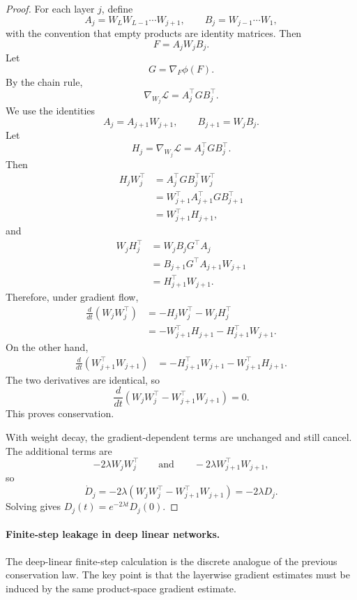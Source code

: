 \documentclass{article}
\newcommand{\Loss}{\mathcal{L}}
\begin{document}
\begin{proof}
For each layer \(j\), define
\[
    A_j=W_LW_{L-1}\cdots W_{j+1},
    \qquad
    B_j=W_{j-1}\cdots W_1,
\]
with the convention that empty products are identity matrices.  Then
\[
    F=A_jW_jB_j.
\]
Let
\[
    G=\nabla_F\phi(F).
\]
By the chain rule,
\[
    \nabla_{W_j}\Loss
    =
    A_j^\top G B_j^\top.
\]
We use the identities
\[
    A_j=A_{j+1}W_{j+1},
    \qquad
    B_{j+1}=W_jB_j.
\]
Let
\[
    H_j=\nabla_{W_j}\Loss=A_j^\top G B_j^\top.
\]
Then
\[
\begin{aligned}
    H_jW_j^\top
    &=
    A_j^\top G B_j^\top W_j^\top  \\
    &=
    W_{j+1}^\top A_{j+1}^\top G B_{j+1}^\top  \\
    &=
    W_{j+1}^\top H_{j+1},
\end{aligned}
\]
and
\[
\begin{aligned}
    W_jH_j^\top
    &=
    W_jB_jG^\top A_j  \\
    &=
    B_{j+1}G^\top A_{j+1}W_{j+1}  \\
    &=
    H_{j+1}^\top W_{j+1}.
\end{aligned}
\]
Therefore, under gradient flow,
\[
\begin{aligned}
    \frac{d}{dt}(W_jW_j^\top)
    &=
    -H_jW_j^\top-W_jH_j^\top  \\
    &=
    -W_{j+1}^\top H_{j+1}
    -
    H_{j+1}^\top W_{j+1}.
\end{aligned}
\]
On the other hand,
\[
\begin{aligned}
    \frac{d}{dt}(W_{j+1}^\top W_{j+1})
    &=
    -H_{j+1}^\top W_{j+1}
    -
    W_{j+1}^\top H_{j+1}.
\end{aligned}
\]
The two derivatives are identical, so
\[
    \frac{d}{dt}
    \left(
        W_jW_j^\top
        -
        W_{j+1}^\top W_{j+1}
    \right)
    =
    0.
\]
This proves conservation.

With weight decay, the gradient-dependent terms are unchanged and still
cancel.  The additional terms are
\[
    -2\lambda W_jW_j^\top
    \qquad\text{and}\qquad
    -2\lambda W_{j+1}^\top W_{j+1},
\]
so
\[
    \dot D_j
    =
    -2\lambda
    \left(
        W_jW_j^\top
        -
        W_{j+1}^\top W_{j+1}
    \right)
    =
    -2\lambda D_j.
\]
Solving gives \(D_j(t)=e^{-2\lambda t}D_j(0)\).
\end{proof}

\paragraph{Finite-step leakage in deep linear networks.}
The deep-linear finite-step calculation is the discrete analogue of the
previous conservation law.  The key point is that the layerwise gradient
estimates must be induced by the same product-space gradient estimate.
\end{document}
